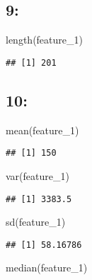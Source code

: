 \documentclass[
]{article}
\newenvironment{Shaded}{\begin{snugshade}}{\end{snugshade}}
\newcommand{\FunctionTok}[1]{\textcolor[rgb]{0.00,0.00,0.00}{#1}}
\newcommand{\NormalTok}[1]{#1}
\begin{document}
\hypertarget{section-8}{%
\subsection{9:}\label{section-8}}

\begin{Shaded}
\begin{Highlighting}[]
\FunctionTok{length}\NormalTok{(feature\_1)}
\end{Highlighting}
\end{Shaded}

\begin{verbatim}
## [1] 201
\end{verbatim}

\hypertarget{section-9}{%
\subsection{10:}\label{section-9}}

\begin{Shaded}
\begin{Highlighting}[]
\FunctionTok{mean}\NormalTok{(feature\_1)}
\end{Highlighting}
\end{Shaded}

\begin{verbatim}
## [1] 150
\end{verbatim}

\begin{Shaded}
\begin{Highlighting}[]
\FunctionTok{var}\NormalTok{(feature\_1)}
\end{Highlighting}
\end{Shaded}

\begin{verbatim}
## [1] 3383.5
\end{verbatim}

\begin{Shaded}
\begin{Highlighting}[]
\FunctionTok{sd}\NormalTok{(feature\_1)}
\end{Highlighting}
\end{Shaded}

\begin{verbatim}
## [1] 58.16786
\end{verbatim}

\begin{Shaded}
\begin{Highlighting}[]
\FunctionTok{median}\NormalTok{(feature\_1)}
\end{Highlighting}
\end{Shaded}
\end{document}
